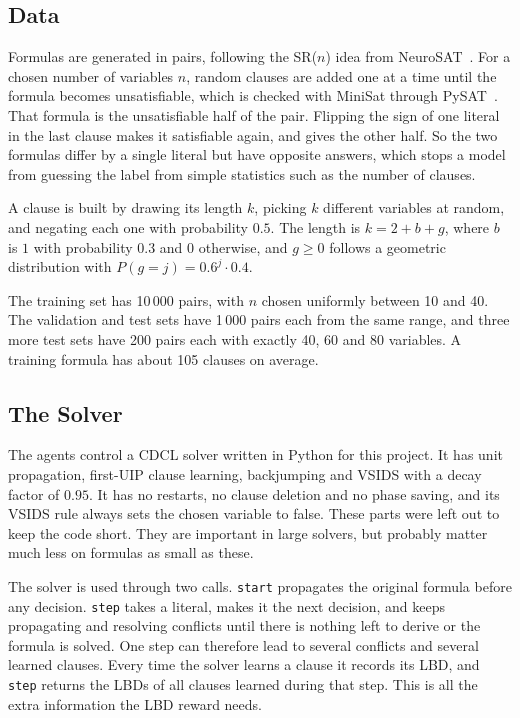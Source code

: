 \documentclass[11pt,a4paper]{article}
\begin{document}
\subsection{Data}

Formulas are generated in pairs, following the SR($n$) idea from NeuroSAT~\cite{selsam2019neurosat}. For a chosen number of variables $n$, random clauses are added one at a time until the formula becomes unsatisfiable, which is checked with MiniSat through PySAT~\cite{ignatiev2018pysat}. That formula is the unsatisfiable half of the pair. Flipping the sign of one literal in the last clause makes it satisfiable again, and gives the other half. So the two formulas differ by a single literal but have opposite answers, which stops a model from guessing the label from simple statistics such as the number of clauses.

A clause is built by drawing its length $k$, picking $k$ different variables at random, and negating each one with probability $0.5$. The length is $k = 2 + b + g$, where $b$ is $1$ with probability $0.3$ and $0$ otherwise, and $g \geq 0$ follows a geometric distribution with $P(g = j) = 0.6^{j} \cdot 0.4$.

The training set has 10\,000 pairs, with $n$ chosen uniformly between 10 and 40. The validation and test sets have 1\,000 pairs each from the same range, and three more test sets have 200 pairs each with exactly 40, 60 and 80 variables. A training formula has about 105 clauses on average.

\subsection{The Solver}

The agents control a CDCL solver written in Python for this project. It has unit propagation, first-UIP clause learning, backjumping and VSIDS with a decay factor of $0.95$. It has no restarts, no clause deletion and no phase saving, and its VSIDS rule always sets the chosen variable to false. These parts were left out to keep the code short. They are important in large solvers, but probably matter much less on formulas as small as these.

The solver is used through two calls. \texttt{start} propagates the original formula before any decision. \texttt{step} takes a literal, makes it the next decision, and keeps propagating and resolving conflicts until there is nothing left to derive or the formula is solved. One step can therefore lead to several conflicts and several learned clauses. Every time the solver learns a clause it records its LBD, and \texttt{step} returns the LBDs of all clauses learned during that step. This is all the extra information the LBD reward needs.
\end{document}
